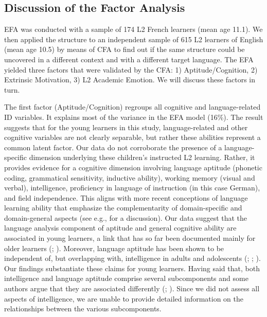 \documentclass[output=paper]{langsci/langscibook}
\begin{document}
\subsection{Discussion of the Factor Analysis}

EFA was conducted with a sample of 174 L2 French learners (mean age 11.1). We then applied the structure to an independent sample of 615 L2 learners of English (mean age 10.5) by means of CFA to find out if the same structure could be uncovered in a different context and with a different target language. The EFA yielded three factors that were validated by the CFA: 1) Aptitude/Cognition, 2) Extrinsic Motivation, 3) L2 Academic Emotion. We will discuss these factors in turn.

The first factor (Aptitude/Cognition) regroups all cognitive and language-re\-lat\-ed ID variables. It explains most of the variance in the EFA model (16\%). The result suggests that for the young learners in this study, language-re\-lat\-ed and other cognitive variables are not clearly separable, but rather these abilities represent a common latent factor. Our data do not corroborate the presence of a language-specific dimension underlying these children’s instructed L2 learning. Rather, it provides evidence for a cognitive dimension involving language aptitude (phonetic coding, grammatical sensitivity, inductive ability), working memory (visual and verbal), intelligence, proficiency in language of instruction (in this case German), and field independence. This aligns with more recent conceptions of language learning ability that emphasize the complementarity of domain-specific and domain-general aspects (see e.g., \citealt{Skehan2019} for a discussion). Our data suggest that the language analysis component of aptitude and general cognitive ability are associated in young learners, a link that has so far been documented mainly for older learners (\citealt{Granena2012,Granena2012}; \citealt{Sasaki1996}). Moreover, language aptitude has been shown to be independent of, but overlapping with, intelligence in adults and adolescents (\citealt{WescheEtAl1982}; \citealt{Sasaki1996}; \citealt[827]{Li2016}). Our findings substantiate these claims for young learners. Having said that, both intelligence and language aptitude comprise several subcomponents and some authors argue that they are associated differently (\citealt{Granena2013}; \citealt{Li2016}). Since we did not assess all aspects of intelligence, we are unable to provide detailed information on the relationships between the various subcomponents.
\end{document}
